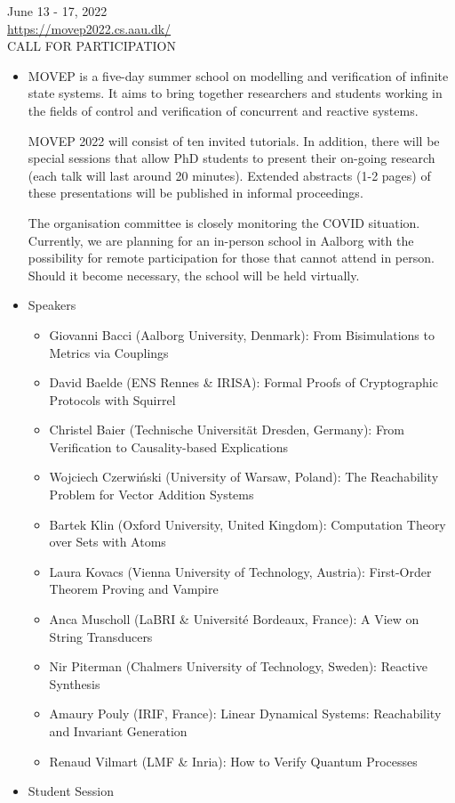 \documentclass[prodmode,acmtecs]{acmsmall} %
\begin{document}
  June 13 - 17, 2022\\ 
  \href{https://movep2022.cs.aau.dk/}{https://movep2022.cs.aau.dk/}\\ 
CALL FOR PARTICIPATION 

\begin{itemize}\item  MOVEP is a five-day summer school on modelling and verification of infinite state systems. It aims to bring together researchers and students working in the fields of control and verification of concurrent and reactive systems. 
 
  MOVEP 2022 will consist of ten invited tutorials. In addition, there will be special sessions that allow PhD students to present their on-going research (each talk will last around 20 minutes). Extended abstracts (1-2 pages) of these presentations will be published in informal proceedings. 
 
  The organisation committee is closely monitoring the COVID situation. Currently, we are planning for an in-person school in Aalborg with the possibility for remote participation for those that cannot attend in person. Should it become necessary, the school will be held virtually. 
 
\item  Speakers 
 
\begin{itemize}\item Giovanni Bacci (Aalborg University, Denmark): From Bisimulations to Metrics via Couplings
\item David Baelde (ENS Rennes \& IRISA): Formal Proofs of Cryptographic Protocols with Squirrel
\item Christel Baier (Technische Universität Dresden, Germany): From Verification to Causality-based Explications
\item Wojciech Czerwiński (University of Warsaw, Poland): The Reachability Problem for Vector Addition Systems
\item Bartek Klin (Oxford University, United Kingdom): Computation Theory over Sets with Atoms 
\item Laura Kovacs (Vienna University of Technology, Austria): First-Order Theorem Proving and Vampire
\item Anca Muscholl (LaBRI \& Université Bordeaux, France): A View on String Transducers
\item Nir Piterman (Chalmers University of Technology, Sweden): Reactive Synthesis
\item Amaury Pouly (IRIF, France): Linear Dynamical Systems: Reachability and Invariant Generation
\item Renaud Vilmart (LMF \& Inria): How to Verify Quantum Processes
\end{itemize} 
\item  Student Session 
 

\end{itemize}
\end{document}
